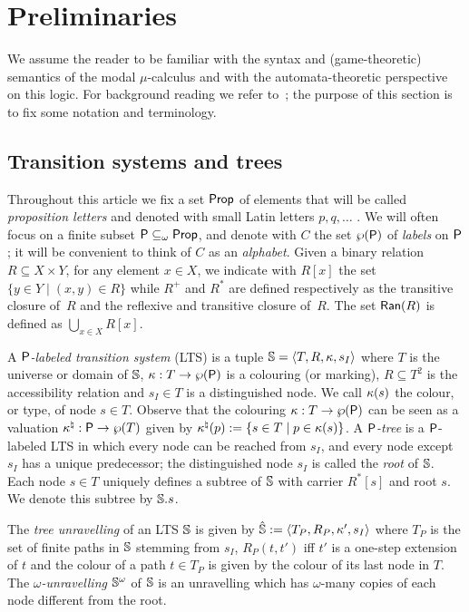 \section{Preliminaries}
   \label{sec:prel}

We assume the reader to be familiar with the syntax and (game-theoretic)
semantics of the modal $\mu$-calculus and with the automata-theoretic 
perspective on this logic.
For background reading we refer to~\cite{ALG02,Ven08}; the purpose of this 
section is to fix some notation and terminology. 

\subsection{Transition systems and trees} 
\label{ssec:prelim_trees}

Throughout this article we fix a set $\mathsf{Prop}$ of elements that will be called
\emph{proposition letters} and denoted with small Latin letters $p, q, \ldots$ .
We will often focus on a finite subset $\mathsf{P} \subseteq_{\omega} \mathsf{Prop}$, and
denote with $C$ the set $\wp (\mathsf{P})$ of \emph{labels} on $\mathsf{P}$; it will
be convenient to think of $C$ as an \emph{alphabet}.
Given a binary relation $R \subseteq X \times Y$, for any element $x \in X$,
we indicate with $R[x]$ the set $\{ y \in Y \mid (x,y) \in R \}$ while 
$R^+$ and $R^{*}$ are defined respectively as the transitive closure of~$R$ and
the reflexive and transitive closure of~$R$. 
The set $\mathsf{Ran}(R)$ is defined as $\bigcup_{x\in X}R[x]$.

A \emph{$\mathsf{P}$-labeled transition system} (LTS) is a tuple $\mathbb{S} = 
\langle{T,R,\kappa,s_I}\rangle$ where $T$ is the universe or domain of $\mathbb{S}$, 
$\kappa:T\to\wp(\mathsf{P})$ is a colouring (or marking),
$R\subseteq T^2$ is the accessibility relation and $s_I \in T$ is a 
distinguished node.
We call $\kappa(s)$ the colour, or type, of node $s \in T$.
Observe that the colouring %
${\kappa:T\to\wp(\mathsf{P})}$ can be seen as a 
valuation $\kappa^\natural:\mathsf{P}\to\wp (T)$ given by $\kappa^\natural(p) \mathrel{:=} \{s \in T \mid
p\in \kappa(s)\}$. 
%
A \emph{$\mathsf{P}$-tree} is a $\mathsf{P}$-labeled LTS in which every node can
be reached from $s_I$, and every node except $s_I$ has a unique predecessor;
the distinguished node $s_I$ is called the \emph{root} of $\mathbb{S}$.
Each node $s \in T$ uniquely defines a subtree of $\mathbb{S}$ with carrier
$R^{*}[s]$ and root $s$. We denote this subtree by ${\mathbb{S}.s}$.

The \emph{tree unravelling} of an LTS $\mathbb{S}$ is given by $\hat{\mathbb{S}} 
\mathrel{:=} \langle{T_P,R_P,\kappa',s_I}\rangle$ where $T_P$ is the set of finite paths in 
$\mathbb{S}$ stemming from $s_I$, $R_P(t,t')$ iff $t'$ is a one-step extension of $t$ 
and the colour of a path $t\in T_P$ is given by the colour of its last node in
$T$.
The \emph{$\omega$-unravelling} ${\mathbb{S}}^\omega$ of $\mathbb{S}$ is an 
unravelling which has $\omega$-many copies of each node different from the root.

